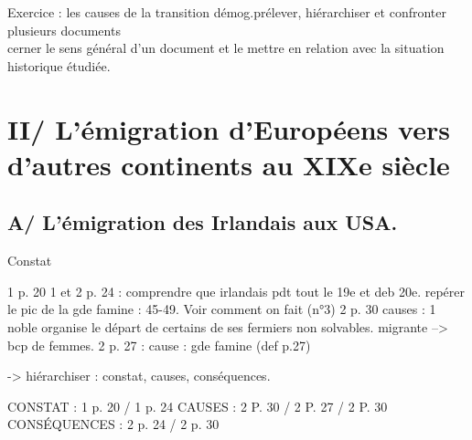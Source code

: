 \documentclass{beamer}
\begin{document}
\begin{frame}{Exercice : les causes de la transition démog.}{prélever, hiérarchiser et confronter plusieurs documents \\ cerner le sens général d'un document et le mettre en relation avec la situation historique étudiée.}





\end{frame}

\section{II/ L'émigration d'Européens vers d'autres continents au XIXe siècle}

\subsection{A/ L'émigration des Irlandais aux USA.}

\begin{frame}{Constat} %

1 p. 20
1 et 2 p. 24 : comprendre que irlandais pdt tout le 19e et deb 20e. repérer le pic de la gde famine : 45-49. Voir comment on fait (n°3)
2 p. 30 causes : 1 noble organise le départ de certains de ses fermiers non solvables. migrante --> bcp de femmes. 
2 p. 27 : cause : gde famine (def p.27)



-> hiérarchiser : constat, causes, conséquences.

CONSTAT : 1 p. 20 / 1 p. 24
CAUSES : 2 P. 30 / 2 P. 27 / 2 P. 30
CONSÉQUENCES : 2 p. 24 / 2 p. 30

\end{frame}

\begin{frame}
\end{frame}
\end{document}
